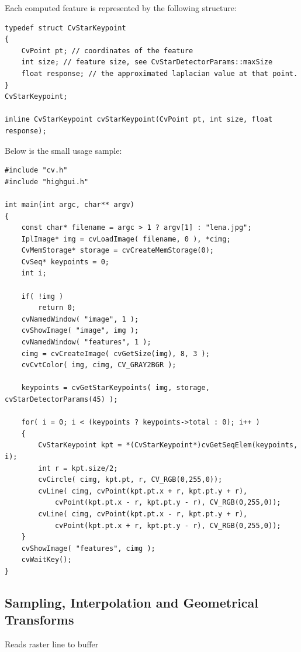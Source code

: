 Each computed feature is represented by the following structure:

\begin{lstlisting}
typedef struct CvStarKeypoint
{
    CvPoint pt; // coordinates of the feature
    int size; // feature size, see CvStarDetectorParams::maxSize
    float response; // the approximated laplacian value at that point.
}
CvStarKeypoint;

inline CvStarKeypoint cvStarKeypoint(CvPoint pt, int size, float response);
\end{lstlisting}

Below is the small usage sample:

\begin{lstlisting}
#include "cv.h"
#include "highgui.h"

int main(int argc, char** argv)
{
    const char* filename = argc > 1 ? argv[1] : "lena.jpg";
    IplImage* img = cvLoadImage( filename, 0 ), *cimg;
    CvMemStorage* storage = cvCreateMemStorage(0);
    CvSeq* keypoints = 0;
    int i;

    if( !img )
        return 0;
    cvNamedWindow( "image", 1 );
    cvShowImage( "image", img );
    cvNamedWindow( "features", 1 );
    cimg = cvCreateImage( cvGetSize(img), 8, 3 );
    cvCvtColor( img, cimg, CV_GRAY2BGR );

    keypoints = cvGetStarKeypoints( img, storage, cvStarDetectorParams(45) );

    for( i = 0; i < (keypoints ? keypoints->total : 0); i++ )
    {
        CvStarKeypoint kpt = *(CvStarKeypoint*)cvGetSeqElem(keypoints, i);
        int r = kpt.size/2;
        cvCircle( cimg, kpt.pt, r, CV_RGB(0,255,0));
        cvLine( cimg, cvPoint(kpt.pt.x + r, kpt.pt.y + r),
            cvPoint(kpt.pt.x - r, kpt.pt.y - r), CV_RGB(0,255,0));
        cvLine( cimg, cvPoint(kpt.pt.x - r, kpt.pt.y + r),
            cvPoint(kpt.pt.x + r, kpt.pt.y - r), CV_RGB(0,255,0));
    }
    cvShowImage( "features", cimg );
    cvWaitKey();
}
\end{lstlisting}

\subsection{Sampling, Interpolation and Geometrical Transforms}

\label{SampleLine}
Reads raster line to buffer


